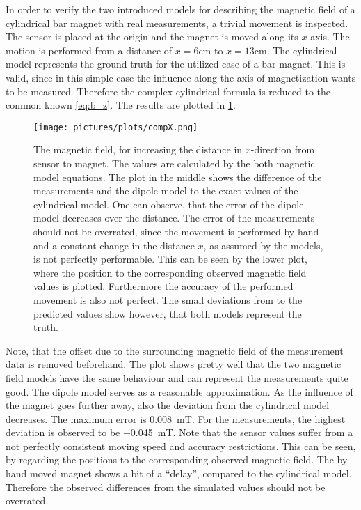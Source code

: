 In order to verify the two introduced models for describing the magnetic field of a cylindrical bar magnet with real measurements, a trivial movement is inspected. The sensor is placed at the origin and the magnet is moved along its $ x $-axis. The motion is performed from a distance of $ x=6\si{\cm} $ to $ x=13\si{\cm} $. The cylindrical model represents the ground truth for the utilized case of a bar magnet. This is valid, since in this simple case the influence along the axis of magnetization wants to be measured. Therefore the complex cylindrical formula is reduced to the common known \ref{eq:b_z}. The results are plotted in \ref{fig:modCompFlat}.
\begin{figure}[!htb]
\centering
\texttt{[image: pictures/plots/compX.png]}
\caption[Comparing the models and sensor measurements for flat movement]
{The magnetic field, for increasing the distance in $ x $-direction from sensor to magnet. The values are calculated by the both magnetic model equations. The plot in the middle shows the difference of the measurements and the dipole model to the exact values of the cylindrical model. One can observe, that the error of the dipole model decreases over the distance. The error of the measurements should not be overrated, since the movement is performed by hand and a constant change in the distance $ x $, as assumed by the models, is not perfectly performable. This can be seen by the lower plot, where the position to the corresponding observed magnetic field values is plotted. Furthermore the accuracy of the performed movement is also not perfect. The small deviations from to the predicted values show however, that both models represent the truth.}
\label{fig:modCompFlat}
\end{figure}
Note, that the offset due to the surrounding magnetic field of the measurement data is removed beforehand. The plot shows pretty well that the two magnetic field models have the same behaviour and can represent the measurements quite good. The dipole model serves as a reasonable approximation. As the influence of the magnet goes further away, also the deviation from the cylindrical model decreases. The maximum error is \SI{0.008}{\milli \tesla}. For the measurements, the highest deviation is observed to be \SI{-0.045}{\milli \tesla}. Note that the sensor values suffer from a not perfectly consistent moving speed and accuracy restrictions. This can be seen, by regarding the positions to the corresponding observed magnetic field. The by hand moved magnet shows a bit of a ``delay'', compared to the cylindrical model. Therefore the observed differences from the simulated values should not be overrated.


